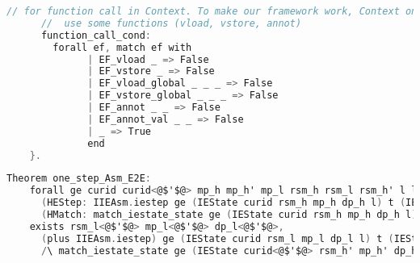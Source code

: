 \begin{lstlisting}[language=C]
      // for function call in Context. To make our framework work, Context on our layers should not 
      //  use some functions (vload, vstore, annot) 
      function_call_cond:
        forall ef, match ef with
              | EF_vload _ => False
              | EF_vstore _ => False
              | EF_vload_global _ _ _ => False
              | EF_vstore_global _ _ _ => False
              | EF_annot _ _ => False
              | EF_annot_val _ _ => False
              | _ => True
              end
    }.
\end{lstlisting}

\begin{lstlisting}[language=C]
  Theorem one_step_Asm_E2E:
    forall ge curid curid<@$'$@> mp_h mp_h' mp_l rsm_h rsm_l rsm_h' l l<@$'$@> (dp_h dp_l dp_h' : ZMap.t (option dproc)) t
      (HEStep: IIEAsm.iestep ge (IEState curid rsm_h mp_h dp_h l) t (IEState curid<@$'$@> rsm_h' mp_h' dp_h' l<@$'$@>))
      (HMatch: match_iestate_state ge (IEState curid rsm_h mp_h dp_h l) (IEState curid rsm_l mp_l dp_l l)),
    exists rsm_l<@$'$@> mp_l<@$'$@> dp_l<@$'$@>,
      (plus IIEAsm.iestep) ge (IEState curid rsm_l mp_l dp_l l) t (IEState curid<@$'$@> rsm_l<@$'$@> mp_l<@$'$@> dp_l<@$'$@> l<@$'$@>)
      /\ match_iestate_state ge (IEState curid<@$'$@> rsm_h' mp_h' dp_h' l<@$'$@>) (IEState curid<@$'$@> rsm_l<@$'$@> mp_l<@$'$@> dp_l<@$'$@> l<@$'$@>).
\end{lstlisting}